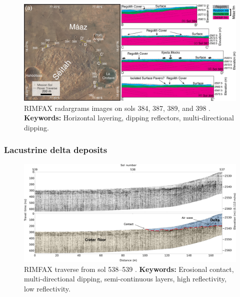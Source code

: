 \begin{figure}[h!]
    \centering
    \includegraphics[width=0.9\linewidth]{Figures/0.5RIMFAX/Shoemaker_2024-f16.jpg}
    \caption[RIMFAX radargrams images on sols 384, 387, 389, and 398.]{RIMFAX radargrams images on sols 384, 387, 389, and 398 \citep{shoemaker2024}. \textbf{Keywords:} Horizontal layering, dipping reflectors, multi-directional dipping.} 
    \label{fig:Shoemaker24-16}
\end{figure}
\clearpage
\subsubsection{Lacustrine delta deposits}
\begin{figure}[h!]
    \centering
    \includegraphics[width=0.9\linewidth]{Figures/0.5RIMFAX/Paige_2024-f3.jpg}
    \caption[RIMFAX traverse from sol 538–539]{RIMFAX traverse from sol 538–539 \citep{Paige2024}. \textbf{Keywords:} Erosional contact, multi-directional dipping, semi-continuous layers, high reflectivity, low reflectivity.}
    \label{fig:Paige24-3}
\end{figure}

